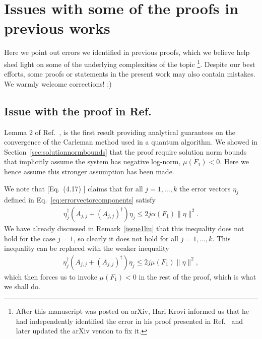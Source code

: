 \documentclass[superscriptaddress,onecolumn,nofootinbib,longbibliography,a4paper,accepted=2026-09-29]{quantumarticle}
\theoremstyle{plain}
\theoremstyle{definition}
\numberwithin{thm}{section}
\numberwithin{assumption}{section}
\numberwithin{lemma}{section}
\numberwithin{prop}{section}
\numberwithin{cor}{section}
\numberwithin{definition}{section}
\numberwithin{rmk}{section}
\numberwithin{equation}{section}
\begin{document}
\section{Issues with some of the proofs in previous works}
\label{app:issue_with_previous_proofs}
Here we point out errors we identified in previous proofs, which we believe help shed light on some of the underlying complexities of the topic \footnote{After this manuscript was posted on arXiv, Hari Krovi informed us that he had independently identified the error in his proof presented in Ref.~\cite{krovi2023improved} and later updated the arXiv version to fix it.}. Despite our best efforts, some  proofs or statements in the present work may also contain mistakes. We warmly welcome corrections!  :)


\subsection{Issue with the proof in \texorpdfstring{Ref.~\cite{liu2021efficient}}{arXiv:2011.03185}}
\label{app:issueliu}

Lemma 2 of Ref.~\cite{liu2021efficient}, is the first result providing analytical guarantees on the convergence of the Carleman method used in a quantum algorithm. We showed in Section~\ref{sec:solutionnormbounds} that the proof require solution norm bounds that implicitly assume the system has negative log-norm, $\mu(F_1)<0$. Here we hence assume this stronger assumption has been made. 
 
 
We note that [Eq.~(4.17) \cite{liu2021efficient}] claims that for all $j=1,\dots,k$ the error vectors $\eta_j$ defined in Eq.~\eqref{eq:errorvectorcomponents} satisfy
\begin{align}
   \eta^\dag_j (A_{j,j} + (A_{j,j})^\dag) \eta_j \leq 2j \alpha(F_1) \|\eta\|^2.
\end{align}
We have already discussed in Remark~\ref{issue1liu} that this inequality does not hold for the case $j=1$, so clearly it does not hold for all $j=1,\dots,k$. This inequality can be replaced with the weaker inequality 
\begin{align}
   \eta^\dag_j (A_{j,j} + (A_{j,j})^\dag) \eta_j \leq 2j \mu(F_1) \|\eta\|^2,
\end{align}
which then forces us to invoke $\mu(F_1)<0$ in the rest of the proof, which is what we shall do. 
\end{document}
